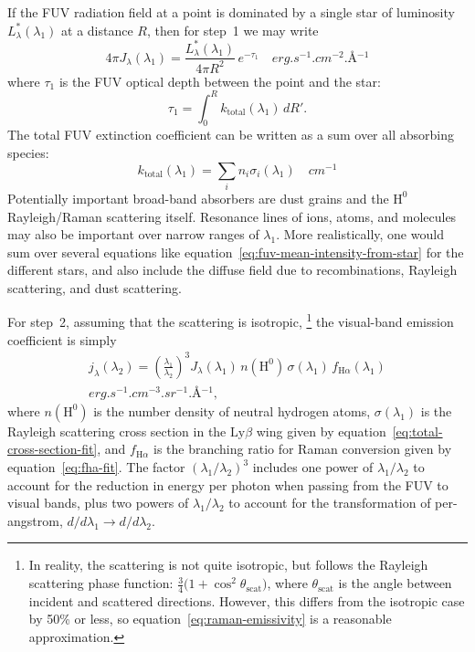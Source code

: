 \documentclass[useAMS, usenatbib, a4paper]{mnras}
\newcommand*\chem[1]{\ensuremath{\mathrm{#1}}}
\newcommand\ha{\ensuremath{\text{H}\alpha}}
\newcommand\lyb{\ensuremath{\text{Ly}\beta}}
\begin{document}
If the FUV radiation field at a point is dominated by a single star
of luminosity \(L_\lambda^*(\lambda_1)\) at a distance \(R\), then for step~1 we may write
\begin{equation}
  \label{eq:fuv-mean-intensity-from-star}
  4\pi J_\lambda(\lambda_1) = \frac{L_\lambda^*(\lambda_1)}{4 \pi R^2} \, e^{-\tau_1}
  \quad \si{erg.s^{-1}.cm^{-2}.\angstrom^{-1}}
\end{equation}
where \(\tau_1\) is the FUV optical depth between the point and the star:
\begin{equation}
  \label{eq:tau-fuv}
  \tau_1 = \int_0^R k_{\text{total}} (\lambda_1) \, dR'.
\end{equation}
The total FUV extinction coefficient can be written as a sum
over all absorbing species:
\begin{equation}
  \label{eq:k-fuv}
  k_{\text{total}} (\lambda_1) = \sum_i n_i \sigma_i(\lambda_1)
  \quad \si{cm^{-1}} 
\end{equation}
Potentially important broad-band absorbers are dust grains
and the \chem{H^0} Rayleigh/Raman scattering itself.
Resonance lines of ions, atoms, and molecules may also be important
over narrow ranges of \(\lambda_1\).
More realistically, one would sum over several equations like equation~\eqref{eq:fuv-mean-intensity-from-star} for the different stars,
and also include the diffuse field due to recombinations, Rayleigh scattering,
and dust scattering.

For step~2, assuming that the scattering is isotropic,%
\footnote{
  In reality, the scattering is not quite isotropic,
  but follows the Rayleigh scattering phase function:
  \(\frac34 \bigl( 1 + \cos^2\theta_{\text{scat}} \bigr)\),
  where \(\theta_{\text{scat}}\) is the angle between
  incident and scattered directions.
  However, this differs from the isotropic case by 50\% or less,
  so equation~\eqref{eq:raman-emissivity} is a reasonable approximation.
}
the visual-band emission coefficient is simply
\begin{multline}
  \label{eq:raman-emissivity}
  j_\lambda (\lambda_2) = \left(  \frac{\lambda_1}{\lambda_2}\right)^3
  J_\lambda(\lambda_1) \, n(\chem{H^0}) \, \sigma(\lambda_1) \, f_{\ha}(\lambda_1) 
  \\ \si{erg.s^{-1}.cm^{-3}.sr^{-1}.\angstrom^{-1}} ,
\end{multline}
where \(n(\chem{H^0})\) is the number density of neutral hydrogen atoms,
\(\sigma(\lambda_1)\) is the Rayleigh scattering cross section
in the \lyb{} wing given by
equation~\eqref{eq:total-cross-section-fit},
and \(f_{\ha}\) is the branching ratio for Raman conversion given by
equation~\eqref{eq:fha-fit}.
The factor \((\lambda_1 / \lambda_2)^3\) includes one power of \(\lambda_1/\lambda_2\)
to account for the reduction in energy per photon when passing from
the FUV to visual bands,
plus two powers of \(\lambda_1/\lambda_2\) to account for the transformation of
per-angstrom, \(d/d\lambda_1 \to d/d\lambda_2\).
\end{document}
